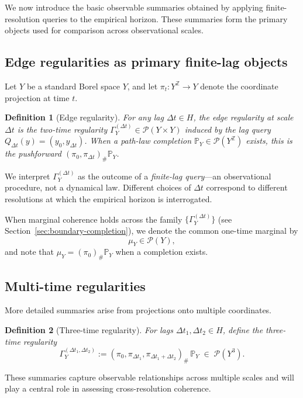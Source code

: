 \documentclass[11pt]{article}
\newtheorem{definition}{Definition}
\begin{document}
We now introduce the basic observable summaries obtained by applying
finite-resolution queries to the empirical horizon. These summaries form the
primary objects used for comparison across observational scales.

\subsection{Edge regularities as primary finite-lag objects}

Let $Y$ be a
standard Borel space $Y$, and let $\pi_t:Y^{\mathbb Z}\to Y$ denote the
coordinate projection at time $t$.

\begin{definition}[Edge regularity]\label{def:edge-regularity}
For any lag $\Delta t\in H$, the \emph{edge regularity} at scale $\Delta t$ is the two-time
regularity $\Gamma_Y^{(\Delta t)}\in\mathcal P(Y\times Y)$ induced by the lag query
$Q_{\Delta t}(y)=(y_0,y_{\Delta t})$.
When a path-law completion $\mathbb P_Y\in\mathcal P(Y^{\mathbb Z})$ exists, this is the
pushforward $(\pi_0,\pi_{\Delta t})_\#\mathbb P_Y$.
\end{definition}

We interpret $\Gamma_Y^{(\Delta t)}$ as the outcome of a \emph{finite-lag
query}---an observational procedure, not a dynamical law.  Different choices of
$\Delta t$ correspond to different resolutions at which the empirical horizon is
interrogated.

When marginal coherence holds across the family $\{\Gamma_Y^{(\Delta t)}\}$ (see
Section~\ref{sec:boundary-completion}), we denote the common one-time marginal by
\[
\mu_Y\in\mathcal P(Y),
\]
and note that $\mu_Y=(\pi_0)_\#\mathbb P_Y$ when a completion exists.

\subsection{Multi-time regularities}

More detailed summaries arise from projections onto multiple coordinates.

\begin{definition}[Three-time regularity]\label{def:three-time}
For lags $\Delta t_1,\Delta t_2\in H$, define the three-time regularity
\[
\Gamma_Y^{(\Delta t_1,\Delta t_2)}
:=
(\pi_0,\pi_{\Delta t_1},\pi_{\Delta t_1+\Delta t_2})_\#\,\mathbb P_Y
\;\in\; \mathcal P(Y^3).
\]
\end{definition}

These summaries capture observable relationships across multiple scales and
will play a central role in assessing cross-resolution coherence.
\end{document}
